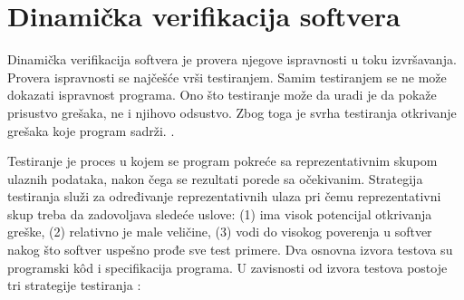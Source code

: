 \documentclass[12pt,oneside]{memoir}
\begin{document}
\section{Dinamička verifikacija softvera}
Dinamička verifikacija softvera je provera njegove ispravnosti u toku izvršavanja. Provera ispravnosti se najčešće vrši testiranjem. Samim testiranjem se ne može dokazati ispravnost programa. Ono što testiranje može da uradi je da pokaže prisustvo grešaka, ne i njihovo odsustvo. Zbog toga je svrha testiranja otkrivanje grešaka koje program sadrži.  \cite{mvj}.  

Testiranje je proces u kojem se program pokreće sa reprezentativnim skupom ulaznih podataka, nakon čega se rezultati porede sa očekivanim. Strategija testiranja služi za određivanje reprezentativnih ulaza pri čemu reprezentativni skup treba da zadovoljava sledeće uslove: (1) ima visok potencijal otkrivanja greške, (2) relativno je male veličine, (3) vodi do visokog poverenja u softver nakog što softver uspešno prođe sve test primere. Dva osnovna izvora testova su programski k\^od i specifikacija programa. U zavisnosti od izvora testova postoje tri strategije testiranja \cite{mvj}:
\end{document}
